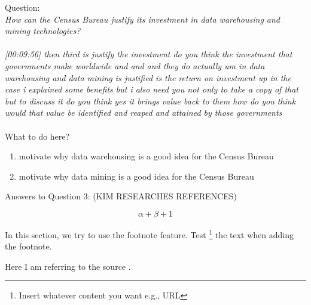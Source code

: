 Question:\\
\emph{
    How can the Census Bureau justify its investment in data warehousing and mining
technologies?
}\\\\

\emph{[00:09:56] then third is justify the investment do you think the investment that governments make worldwide
and and and they do actually um in data warehousing and data mining is justified is the return on investment
up in the case i explained some benefits but i also need you not only to take a copy of that but
to discuss it do you think yes it brings value back to them how do you think would that value be
identified and reaped and attained by those governments}\\\\

What to do here?
\begin{enumerate}
    \item motivate why data warehousing is a good idea for the Census Bureau
    \item motivate why data mining is a good idea for the Census Bureau
  \end{enumerate}

\newpage Answers to Question 3: (KIM RESEARCHES REFERENCES)

\newpage 
\begin{equation}
\alpha + \beta + 1
\end{equation}

In this section, we try to use the footnote feature. 
Test \footnote{Insert whatever content you want e.g., URL} the text when adding the footnote.

Here I am referring to the source \cite{DataScience}.